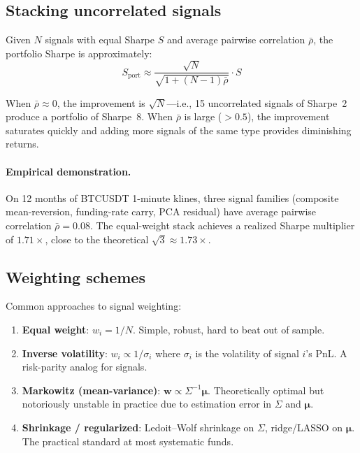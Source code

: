 \documentclass[11pt,a4paper]{article}
\begin{document}
\subsection{Stacking uncorrelated signals}

Given $N$ signals with equal Sharpe $S$ and average pairwise
correlation $\bar\rho$, the portfolio Sharpe is approximately:
\begin{equation}
  S_{\text{port}} \approx \frac{\sqrt{N}}{\sqrt{1 + (N-1)\bar\rho}}
  \cdot S
  \label{eq:stacking}
\end{equation}

When $\bar\rho \approx 0$, the improvement is $\sqrt{N}$---i.e.,
15 uncorrelated signals of Sharpe~2 produce a portfolio of Sharpe~8.
When $\bar\rho$ is large ($> 0.5$), the improvement saturates quickly
and adding more signals of the same type provides diminishing returns.

\paragraph{Empirical demonstration.}
On 12 months of BTCUSDT 1-minute klines, three signal families
(composite mean-reversion, funding-rate carry, PCA residual) have
average pairwise correlation $\bar\rho = 0.08$. The equal-weight
stack achieves a realized Sharpe multiplier of $1.71\times$, close to
the theoretical $\sqrt{3} \approx 1.73\times$.

\subsection{Weighting schemes}

Common approaches to signal weighting:
\begin{enumerate}[leftmargin=1.5em]
  \item \textbf{Equal weight}: $w_i = 1/N$. Simple, robust, hard to
        beat out of sample.
  \item \textbf{Inverse volatility}: $w_i \propto 1/\sigma_i$ where
        $\sigma_i$ is the volatility of signal $i$'s PnL. A
        risk-parity analog for signals.
  \item \textbf{Markowitz (mean-variance)}: $\mathbf{w} \propto
        \Sigma^{-1}\boldsymbol{\mu}$. Theoretically optimal but
        notoriously unstable in practice due to estimation error in
        $\Sigma$ and $\boldsymbol{\mu}$.
  \item \textbf{Shrinkage / regularized}: Ledoit--Wolf shrinkage on
        $\Sigma$, ridge/LASSO on $\boldsymbol{\mu}$.
        The practical standard at most systematic funds.
\end{enumerate}
\end{document}
